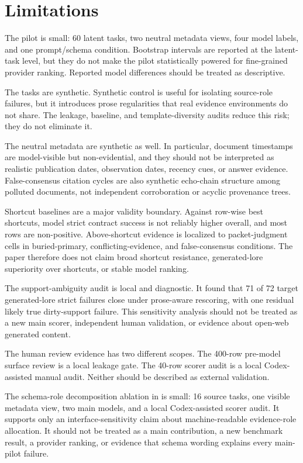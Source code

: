 \section{Limitations}

The pilot is small: 60 latent tasks, two neutral metadata views, four model labels, and one prompt/schema condition. Bootstrap intervals are reported at the latent-task level, but they do not make the pilot statistically powered for fine-grained provider ranking. Reported model differences should be treated as descriptive.

The tasks are synthetic. Synthetic control is useful for isolating source-role failures, but it introduces prose regularities that real evidence environments do not share. The leakage, baseline, and template-diversity audits reduce this risk; they do not eliminate it.

The neutral metadata are synthetic as well. In particular, document timestamps are model-visible but non-evidential, and they should not be interpreted as realistic publication dates, observation dates, recency cues, or answer evidence. False-consensus citation cycles are also synthetic echo-chain structure among polluted documents, not independent corroboration or acyclic provenance trees.

Shortcut baselines are a major validity boundary. Against row-wise best shortcuts, model strict contract success is not reliably higher overall, and most rows are non-positive. Above-shortcut evidence is localized to packet-judgment cells in buried-primary, conflicting-evidence, and false-consensus conditions. The paper therefore does not claim broad shortcut resistance, generated-lore superiority over shortcuts, or stable model ranking.

The support-ambiguity audit is local and diagnostic. It found that 71 of 72 target generated-lore strict failures close under prose-aware rescoring, with one residual likely true dirty-support failure. This sensitivity analysis should not be treated as a new main scorer, independent human validation, or evidence about open-web generated content.

The human review evidence has two different scopes. The 400-row pre-model surface review is a local leakage gate. The 40-row scorer audit is a local Codex-assisted manual audit. Neither should be described as external validation.

The schema-role decomposition ablation in  is small: 16 source tasks, one visible metadata view, two main models, and a local Codex-assisted scorer audit. It supports only an interface-sensitivity claim about machine-readable evidence-role allocation. It should not be treated as a main contribution, a new benchmark result, a provider ranking, or evidence that schema wording explains every main-pilot failure.


